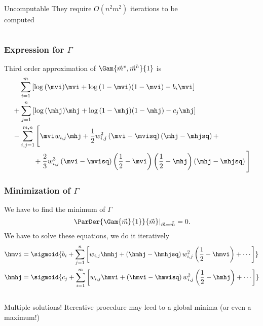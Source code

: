 \begin{frame}
  \begin{columns}[T]
    \centering  
    \begin{alertblock}{Uncomputable}
      They require \(O{(n^2m^2)}\) iterations to be computed
    \end{alertblock}
    \centering
    \begin{figure}
      
    \end{figure}
  \end{columns}
\end{frame}

\begin{frame}
  \frametitle{Expression for \(\Gamma\)}
  Third order approximation of \(\Gam{\vec{m}^v, \vec{m}^h}{1}\) is
  \begin{align*}
    &\quad\sum_{i=1}^{m}\left[\log{\left(\mvi\right)}\mvi + \log{\left(1-\mvi\right)}(1-\mvi)-b_i\mvi\right]\\
    &+\sum_{j=1}^{n}\left[\log{\left(\mhj\right)}\mhj+\log{\left(1-\mhj\right)}(1-\mhj)-c_j\mhj\right]\\
    &-\sum_{i,j=1}^{m,n}\Bigg[
    \mvi w_{i,j}\mhj
    +\frac{1}{2}w_{i,j}^2\left(\mvi-\mvisq\right)\left(\mhj-\mhjsq\right)+\\
    &\qquad\quad+\frac{2}{3}w_{i,j}^3\left(\mvi-\mvisq\right)\left(\frac{1}{2}-\mvi\right)\left(\frac{1}{2}-\mhj\right)
    \left(\mhj-\mhjsq\right)\Bigg]
  \end{align*}
\end{frame}

\begin{frame}
  \frametitle{Minimization  of \(\Gamma\)}
  We have to find the minimum of \(\Gamma\)
  \[
  \left.\ParDer{\Gam{\vec{m}}{1}}{\vec{m}}\right|_{\vec{m}=\vec{\hat{m}}}=0.
  \]
  We  have to solve these equations, we do it iteratively
  \begin{align*}
    \hmvi&=\sigmoid{b_i + \sum_{j=1}^n\left[w_{i,j}\hmhj+
      \left(\hmhj-\hmhjsq\right)w^2_{i,j}\left(\frac{1}{2}-\hmvi\right)
      + \cdots \right]}\\
    \hmhj&=\sigmoid{c_j + \sum_{i=1}^m\left[w_{i,j}\hmvi+
      \left(\hmvi-\hmvisq\right)w^2_{i,j}\left(\frac{1}{2}-\hmhj\right)  + \cdots \right]}
  \end{align*}
  \begin{columns}
    \begin{column}{0.5\textwidth}
      \begin{alertblock}{Multiple solutions!}
        Itereative procedure may leed to a global minima (or even a maximum!)
      \end{alertblock}
    \end{column}
  \end{columns}
\end{frame}

